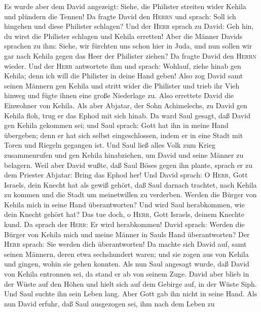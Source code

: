  Es wurde aber dem David angezeigt: Siehe, die Philister
streiten wider Kehila und plündern die Tennen!  Da fragte
David den \textsc{Herrn} und sprach: Soll ich hingehen und diese
Philister schlagen? Und der \textsc{Herr} sprach zu David: Geh hin, du
wirst die Philister schlagen und Kehila erretten!  Aber
die Männer Davids sprachen zu ihm: Siehe, wir fürchten uns schon hier in
Juda, und nun sollen wir gar nach Kehila gegen das Heer der Philister
ziehen?  Da fragte David den \textsc{Herrn} wieder. Und
der \textsc{Herr} antwortete ihm und sprach: Wohlauf, ziehe hinab gen
Kehila; denn ich will die Philister in deine Hand geben! 
Also zog David samt seinen Männern gen Kehila und stritt wider die
Philister und trieb ihr Vieh hinweg und fügte ihnen eine große
Niederlage zu. Also errettete David die Einwohner von Kehila.
 Als aber Abjatar, der Sohn Achimelechs, zu David gen
Kehila floh, trug er das Ephod mit sich hinab.  Da ward
Saul gesagt, daß David gen Kehila gekommen sei; und Saul sprach: Gott
hat ihn in meine Hand übergeben; denn er hat sich selbst eingeschlossen,
indem er in eine Stadt mit Toren und Riegeln gegangen ist.
 Und Saul ließ alles Volk zum Krieg zusammenrufen und gen
Kehila hinabziehen, um David und seine Männer zu belagern.
 Weil aber David wußte, daß Saul Böses gegen ihn plante,
sprach er zu dem Priester Abjatar: Bring das Ephod her! 
Und David sprach: O \textsc{Herr}, Gott Israels, dein Knecht hat als
gewiß gehört, daß Saul darnach trachtet, nach Kehila zu kommen und die
Stadt um meinetwillen zu verderben.  Werden die Bürger
von Kehila mich in seine Hand überantworten? Und wird Saul herabkommen,
wie dein Knecht gehört hat? Das tue doch, o \textsc{Herr}, Gott Israels,
deinem Knechte kund. Da sprach der \textsc{Herr}: Er wird herabkommen!
 David sprach: Werden die Bürger von Kehila mich und
meine Männer in Sauls Hand überantworten? Der \textsc{Herr} sprach: Sie
werden dich überantworten!  Da machte sich David auf,
samt seinen Männern, deren etwa sechshundert waren; und sie zogen aus
von Kehila und gingen, wohin sie gehen konnten. Als nun Saul angesagt
wurde, daß David von Kehila entronnen sei, da stand er ab von seinem
Zuge.  David aber blieb in der Wüste auf den Höhen und
hielt sich auf dem Gebirge auf, in der Wüste Siph. Und Saul suchte ihn
sein Leben lang. Aber Gott gab ihn nicht in seine Hand. 
Als nun David erfuhr, daß Saul ausgezogen sei, ihm nach dem Leben zu
